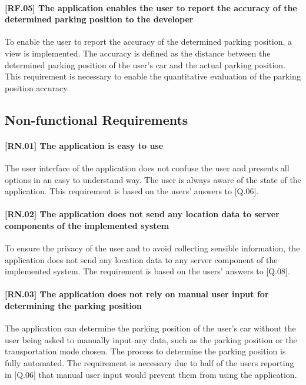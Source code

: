 \paragraph{[RF.05] The application enables the user to report the accuracy of the determined parking position to the developer}
To enable the user to report the accuracy of the determined parking position, a view is implemented. The accuracy is defined as the distance between the determined parking position of the user's car and the actual parking position. This requirement is necessary to enable the quantitative evaluation of the parking position accuracy. 

\subsection{Non-functional Requirements}

\paragraph{[RN.01] The application is easy to use}
The user interface of the application does not confuse the user and presents all options in an easy to understand way. The user is always aware of the state of the application. This requirement is based on the users' answers to [Q.06].

\paragraph{[RN.02] The application does not send any location data to server components of the implemented system}
To ensure the privacy of the user and to avoid collecting sensible information, the application does not send any location data to any server component of the implemented system. The requirement is based on the users' answers to [Q.08].

\paragraph{[RN.03] The application does not rely on manual user input for determining the parking position}
The application can determine the parking position of the user's car without the user being asked to manually input any data, such as the parking position or the transportation mode chosen. The process to determine the parking position is fully automated. The requirement is necessary due to half of the users reporting in [Q.06] that manual user input would prevent them from using the application.

